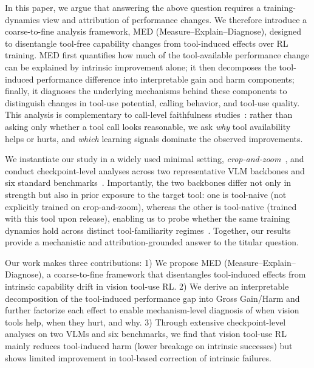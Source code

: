 In this paper, we argue that answering the above question requires a training-dynamics view and attribution of performance changes.
We therefore introduce a coarse-to-fine analysis framework, MED (Measure--Explain--Diagnose), designed to disentangle tool-free capability changes from tool-induced effects over RL training.
MED first quantifies how much of the tool-available performance change can be explained by intrinsic improvement alone; it then decomposes the tool-induced performance difference into interpretable gain and harm components; finally, it diagnoses the underlying mechanisms behind these components to distinguish changes in tool-use potential, calling behavior, and tool-use quality.
This analysis is complementary to call-level faithfulness studies~\cite{yuVFaithLargeMultimodal2025,liuFaithfulnessVisualThinking2025,duRevisitingNecessityLengthy2025}: rather than asking only whether a tool call looks reasonable, we ask \emph{why} tool availability helps or hurts, and \emph{which} learning signals dominate the observed improvements.

We instantiate our study in a widely used minimal setting, \textit{crop-and-zoom}~\cite{suPixelReasonerPixelSpace2025,zhengDeepEyesIncentivizingThinking2025,liuHiDeRethinkingZoomIN2025}, and conduct checkpoint-level analyses across two representative VLM backbones and six standard benchmarks~\cite{laiMinio3ScalingUp2025,vstar,hrbench}.
Importantly, the two backbones differ not only in strength but also in prior exposure to the target tool: one is tool-naive (not explicitly trained on crop-and-zoom), whereas the other is tool-native (trained with this tool upon release), enabling us to probe whether the same training dynamics hold across distinct tool-familiarity regimes~\cite{qwen25vl,qwen3vl}.
Together, our results provide a mechanistic and attribution-grounded answer to the titular question.

%
Our work makes three contributions:
1) We propose MED (Measure--Explain--Diagnose), a coarse-to-fine framework that disentangles tool-induced effects from intrinsic capability drift in vision tool-use RL.
%
2) We derive an interpretable decomposition of the tool-induced performance gap into Gross Gain/Harm and further factorize each effect to enable mechanism-level diagnosis of when vision tools help, when they hurt, and why.
%
3) Through extensive checkpoint-level analyses on two VLMs and six benchmarks, we find that vision tool-use RL mainly reduces tool-induced harm (lower breakage on intrinsic successes) but shows limited improvement in tool-based correction of intrinsic failures.

